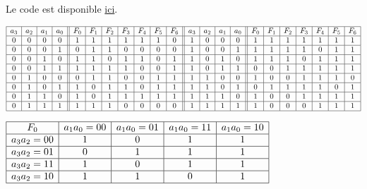 
Le code est disponible \href{https://github.com/Costadoat/S10/raw/master/TP01\%20Fonctions\%20combinatoires/Code/Calculatrice.py}{ici}.


\begin{center}
$\begin{array}{|c|c|c|c||c|c|c|c|c|c|c||c|c|c|c||c|c|c|c|c|c|c|}
\hline
a_3 & a_2 & a_1 & a_0 & F_0 & F_1 & F_2 & F_3 & F_4 & F_5 & F_6 & a_3 & a_2 & a_1 & a_0 & F_0 & F_1 & F_2 & F_3 & F_4 & F_5 & F_6  \\
\hline
0 & 0 & 0 & 0 & 1 & 1 & 1 & 1 & 1 & 1 & 0 & 1 & 0 & 0 & 0 & 1 & 1 & 1 & 1 & 1 & 1 & 1 \\
\hline
0 & 0 & 0 & 1 & 0 & 1 & 1 & 0 & 0 & 0 & 0 & 1 & 0 & 0 & 1 & 1 & 1 & 1 & 1 & 0 & 1 & 1 \\
\hline
0 & 0 & 1 & 0 & 1 & 1 & 0 & 1 & 1 & 0 & 1 & 1 & 0 & 1 & 0 & 1 & 1 & 1 & 0 & 1 & 1 & 1 \\
\hline
0 & 0 & 1 & 1 & 1 & 1 & 1 & 1 & 0 & 0 & 1 & 1 & 0 & 1 & 1 & 0 & 0 & 1 & 1 & 1 & 1 & 1 \\
\hline
0 & 1 & 0 & 0 & 0 & 1 & 1 & 0 & 0 & 1 & 1 & 1 & 1 & 0 & 0 & 1 & 0 & 0 & 1 & 1 & 1 & 0 \\
\hline
0 & 1 & 0 & 1 & 1 & 0 & 1 & 1 & 0 & 1 & 1 & 1 & 1 & 0 & 1 & 0 & 1 & 1 & 1 & 1 & 0 & 1 \\
\hline
0 & 1 & 1 & 0 & 1 & 0 & 1 & 1 & 1 & 1 & 1 & 1 & 1 & 1 & 0 & 1 & 0 & 0 & 1 & 1 & 1 & 1 \\
\hline
0 & 1 & 1 & 1 & 1 & 1 & 1 & 0 & 0 & 0 & 0 & 1 & 1 & 1 & 1 & 1 & 0 & 0 & 0 & 1 & 1 & 1 \\
\hline
\end{array}$
\end{center}


\begin{center}
$\begin{array}{|c|c|c|c|c|}
\hline
F_0 & a_1a_0=00 & a_1a_0=01 & a_1a_0=11 & a_1a_0=10 \\
\hline
a_3a_2=00  &  1  &  0  & 1   &  1  \\
\hline
a_3a_2=01  &  0  &   1 &  1  &  1  \\
\hline
a_3a_2=11  &  1  &  0  &  1  &  1  \\
\hline
a_3a_2=10  &  1  & 1   &  0  &  1  \\
\hline
\end{array}$
\end{center}

